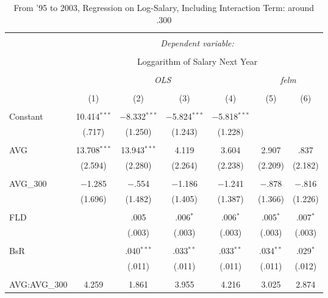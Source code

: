 
\begin{table}[H] \centering
  \caption{From '95 to 2003, Regression on Log-Salary, Including Interaction Term: around .300}
  \label{AVG300_C}
\tiny
\begin{tabular}{@{\extracolsep{5pt}}lcccccc}
\\[-1.8ex]\hline
\hline \\[-1.8ex]
 & \multicolumn{6}{c}{\textit{Dependent variable:}} \\
\cline{2-7}
\\[-1.8ex] & \multicolumn{6}{c}{Loggarithm of Salary Next Year} \\
\\[-1.8ex] & \multicolumn{4}{c}{\textit{OLS}} & \multicolumn{2}{c}{\textit{felm}} \\
\\[-1.8ex] & (1) & (2) & (3) & (4) & (5) & (6)\\
\hline \\[-1.8ex]
 Constant & 10.414$^{***}$ & $-$8.332$^{***}$ & $-$5.824$^{***}$ & $-$5.818$^{***}$ &  &  \\
  & (.717) & (1.250) & (1.243) & (1.228) &  &  \\
  & & & & & & \\
 AVG & 13.708$^{***}$ & 13.943$^{***}$ & 4.119 & 3.604 & 2.907 & .837 \\
  & (2.594) & (2.280) & (2.264) & (2.238) & (2.209) & (2.182) \\
  & & & & & & \\
 AVG\_300 & $-$1.285 & $-$.554 & $-$1.186 & $-$1.241 & $-$.878 & $-$.816 \\
  & (1.696) & (1.482) & (1.405) & (1.387) & (1.366) & (1.226) \\
  & & & & & & \\
 FLD &  & .005 & .006$^{*}$ & .006$^{*}$ & .005$^{*}$ & .007$^{*}$ \\
  &  & (.003) & (.003) & (.003) & (.003) & (.003) \\
  & & & & & & \\
 BsR &  & .040$^{***}$ & .033$^{**}$ & .033$^{**}$ & .034$^{**}$ & .029$^{*}$ \\
  &  & (.011) & (.011) & (.011) & (.011) & (.012) \\
  & & & & & & \\
 AVG:AVG\_300 & 4.259 & 1.861 & 3.955 & 4.216 & 3.025 & 2.874 \\

\end{tabular}
\end{table}
